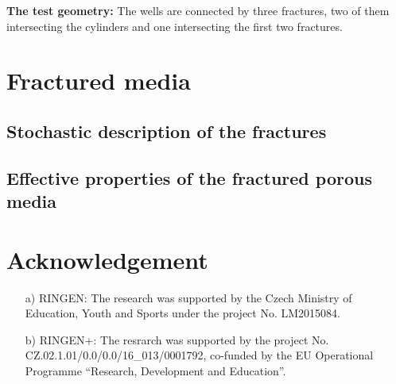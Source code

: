 \documentclass{article}
\begin{document}
{\bf The test geometry:} The wells are connected by three fractures, two of them intersecting the cylinders and one intersecting the first two fractures.

\section{Fractured media}
\subsection{Stochastic description of the fractures}
\subsection{Effective properties of the fractured porous media}

\section*{Acknowledgement}
\begin{itemize}
    \item[a)] RINGEN:
    The research was supported by the Czech Ministry of Education, Youth and Sports under the project No. LM2015084.
 
    \item[b)] RINGEN+:
    The resrarch was supported by the project No. CZ.02.1.01/0.0/0.0/16\_013/0001792, co-funded by the EU Operational Programme ``Research, Development and Education''.
\end{itemize}








\end{document}
